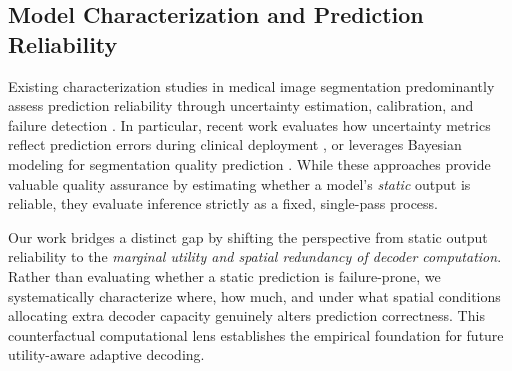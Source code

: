 \subsection{Model Characterization and Prediction Reliability}
Existing characterization studies in medical image segmentation predominantly assess prediction reliability through uncertainty estimation, calibration, and failure detection \cite{gal2016dropout,lakshminarayanan2017simple,kendall2017uncertainties,jungoreyes,uncertaintyreview}. In particular, recent work evaluates how uncertainty metrics reflect prediction errors during clinical deployment \cite{cmig2025clinical}, or leverages Bayesian modeling for segmentation quality prediction \cite{cmig2025quality}. While these approaches provide valuable quality assurance by estimating whether a model's \emph{static} output is reliable, they evaluate inference strictly as a fixed, single-pass process.

Our work bridges a distinct gap by shifting the perspective from static output reliability to the \emph{marginal utility and spatial redundancy of decoder computation}. Rather than evaluating whether a static prediction is failure-prone, we systematically characterize where, how much, and under what spatial conditions allocating extra decoder capacity genuinely alters prediction correctness. This counterfactual computational lens establishes the empirical foundation for future utility-aware adaptive decoding.
